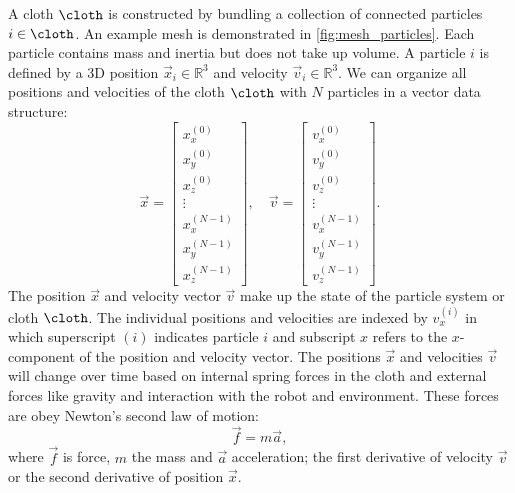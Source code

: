 \documentclass[\home/main.tex]{subfiles}
\begin{document}
A cloth $\cloth$ is constructed by bundling a collection of connected particles $i \in \cloth$. An example mesh is demonstrated in \cref{fig:mesh_particles}. Each particle contains mass and inertia but does not take up volume. A particle $i$ is defined by a 3D position $\vec{x}_i \in \mathbb{R}^3$ and velocity $\vec{v}_i \in \mathbb{R}^3$. We can organize all positions and velocities of the cloth $\cloth$ with $N$ particles in a vector data structure:
\begin{equation}
    \vec{x}=\left[\begin{array}{c}
            x^{(0)}_{x}   \\
            x^{(0)}_{y}   \\
            x^{(0)}_{z}   \\
            \vdots        \\
            x^{(N-1)}_{x} \\
            x^{(N-1)}_{y} \\
            x^{(N-1)}_{z}
        \end{array}
        \right], \quad \vec{v}=\left[\begin{array}{c}
            v^{(0)}_{x}   \\
            v^{(0)}_{y}   \\
            v^{(0)}_{z}   \\
            \vdots        \\
            v^{(N-1)}_{x} \\
            v^{(N-1)}_{y} \\
            v^{(N-1)}_{z}
        \end{array}\right].
\end{equation}
The position $\vec{x}$ and velocity vector $\vec{v}$ make up the state of the particle system or cloth $\cloth$. The individual positions and velocities are indexed by $v^{(i)}_{x}$ in which superscript $(i)$ indicates particle $i$ and subscript $x$ refers to the $x$-component of the position and velocity vector. The positions $\vec{x}$ and velocities $\vec{v}$ will change over time based on internal spring forces in the cloth and external forces like gravity and interaction with the robot and environment. These forces are obey Newton's second law of motion:
\begin{equation}\label{eq:newton_second_law}
    \vec{f} = m\vec{a},
\end{equation}
where $\vec{f}$ is force, $m$ the mass and $\vec{a}$ acceleration; the first derivative of velocity $\vec{v}$ or the second derivative of position $\vec{x}$.
\end{document}
